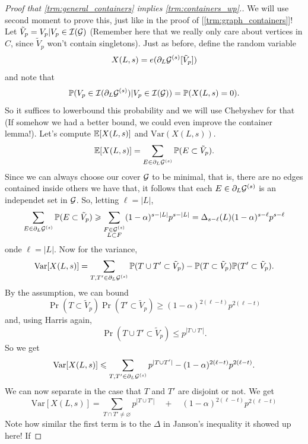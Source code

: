 \begin{proof}[Proof that \ref{trm:general_containers} implies
	\ref{trm:containers_wp}.]
	We will use second moment to prove this, just like in the proof of
	[\ref{trm:graph_containers}]!
	Let $\tilde{V}_p = V_p | V_p \in \mathcal{I}(\mathcal{G})$ (Remember here that we
		really only care about vertices in $C$, since
	$\tilde{V}_p$ won't contain singletons). Just as before, define the
	random variable
	\[
		X(L,s) = e(\partial_L \mathcal{G}^{(s)}[\tilde{V}_p])
	\]
	and note that
	\[
		\mathbb{P}(V_p \in \mathcal{I}(\partial_L \mathcal{G}^{(s)}) | V_p \in \mathcal{I}(\mathcal{G})) = \mathbb{P}(X(L,s) = 0).
	\]
	So it suffices to lowerbound this probability and we will use
	Chebyshev for that (If somehow we had
	a better bound, we could even improve the container lemma!). Let's
	compute $\mathbb{E}[X(L,s)]$ and $\text{Var}(X(L,s))$.
	\[
		\mathbb{E}[X(L,s)] = \sum_{E \in \partial_L \mathcal{G}^{(s)}} \mathbb{P}(E \subset \tilde{V}_p).
	\]
	Since we can always choose our cover $\mathcal{G}$ to be minimal, that is,
	there are no edges contained inside others we have that,
	it follows that each $E \in \partial_L \mathcal{G}^{(s)}$ is an independet
	set in $\mathcal{G}$. So, letting $\ell = |L|$,
	\[
		\sum_{E \in \partial_L \mathcal{G}^{(s)}} \mathbb{P}(E \subset \tilde{V}_p)\geqslant
		\sum_{\substack{F \in \mathcal{G}^{(s)}\\L \subset F}} (1-\alpha)^{s -
		|L|}p^{s - |L|} = \Delta_{s - \ell}(L) (1-\alpha)^{s - \ell}p^{s - \ell}
	\]
	onde $\ell = |L|$. Now for the variance,
	\[
		\text{Var}[X(L,s)] = \sum_{T, T' \in \partial_L\mathcal{G}^{(s)}} \mathbb{P}(T
		\cup T' \subset \tilde{V}_p) - \mathbb{P}(T \subset \tilde{V}_p)\mathbb{P}(T'
		\subset \tilde{V}_p).
	\]
	By the assumption, we can bound
	\[
		\Pr(T \subset \tilde{V}_p)\Pr(T'
		\subset \tilde{V}_p) \geq (1-\alpha)^{2(\ell - t)}p^{2(\ell - t)}
	\]
	and, using Harris again,
	\[
		\Pr(T \cup T' \subset \tilde{V}_p) \leq p^{|T \cup T'|}.
	\]
	So we get
	\[
		\text{Var}[X(L,s)] \leqslant \sum_{T,T' \in \partial_L\mathcal{G}^{(s)}} p^{|T
		\cup T'|} - (1-\alpha)^{2(\ell - t)}p^{2(\ell - t)}.
	\]
	We can now separate in the case that $T$ and $T'$ are disjoint or not. We get
	\[
		\text{Var}[X(L,s)] = \sum_{T \cap T' \neq \varnothing} p^{|T \cup
		T'|} \quad + \quad  (1-\alpha)^{2(\ell - t)}p^{2(\ell - t)}
	\]
	Note how similar the first term is to the $\Delta$ in
	Janson's inequality
	it showed up here! If

\end{proof}

